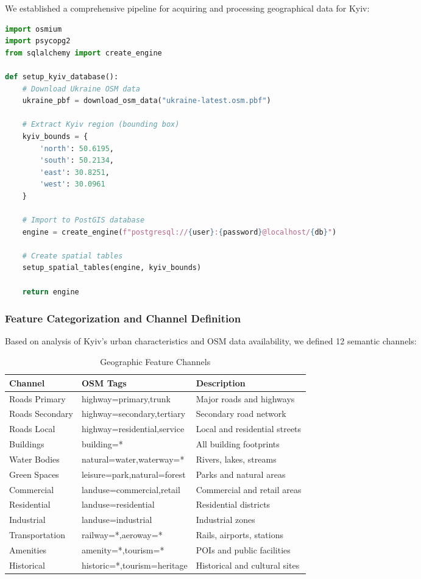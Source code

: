 We established a comprehensive pipeline for acquiring and processing geographical data for Kyiv:

\begin{lstlisting}[language=Python, caption=OSM Data Download and Setup]
import osmium
import psycopg2
from sqlalchemy import create_engine

def setup_kyiv_database():
    # Download Ukraine OSM data
    ukraine_pbf = download_osm_data("ukraine-latest.osm.pbf")

    # Extract Kyiv region (bounding box)
    kyiv_bounds = {
        'north': 50.6195,
        'south': 50.2134,
        'east': 30.8251,
        'west': 30.0961
    }

    # Import to PostGIS database
    engine = create_engine(f"postgresql://{user}:{password}@localhost/{db}")

    # Create spatial tables
    setup_spatial_tables(engine, kyiv_bounds)

    return engine
\end{lstlisting}

\subsubsection{Feature Categorization and Channel Definition}

Based on analysis of Kyiv's urban characteristics and OSM data availability, we defined 12 semantic channels:

\begin{table}[H]
\centering
\caption{Geographic Feature Channels}
\begin{tabular}{|l|l|l|}
\hline
\textbf{Channel} & \textbf{OSM Tags} & \textbf{Description} \\
\hline
Roads Primary & highway=primary,trunk & Major roads and highways \\
Roads Secondary & highway=secondary,tertiary & Secondary road network \\
Roads Local & highway=residential,service & Local and residential streets \\
Buildings & building=* & All building footprints \\
Water Bodies & natural=water,waterway=* & Rivers, lakes, streams \\
Green Spaces & leisure=park,natural=forest & Parks and natural areas \\
Commercial & landuse=commercial,retail & Commercial and retail areas \\
Residential & landuse=residential & Residential districts \\
Industrial & landuse=industrial & Industrial zones \\
Transportation & railway=*,aeroway=* & Rails, airports, stations \\
Amenities & amenity=*,tourism=* & POIs and public facilities \\
Historical & historic=*,tourism=heritage & Historical and cultural sites \\
\hline
\end{tabular}
\end{table}

